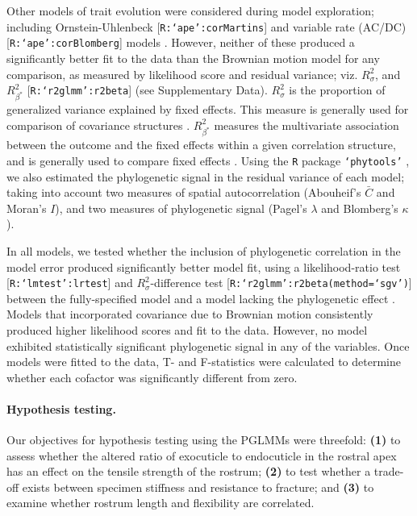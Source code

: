 \documentclass[twocolumn, linenumbers, superscriptaddress, nofootinbib]{revtex4-1}
\begin{document}
				Other models of trait evolution were considered during model exploration; including Ornstein-Uhlenbeck [\texttt{R:`ape':corMartins}] and variable rate (AC/DC) [\texttt{R:`ape':corBlomberg}] models \cite{Munkemuller2012, Ape}.
				However, neither of these produced a significantly better fit to the data than the Brownian motion model for any comparison, as measured by likelihood score and residual variance; viz. $R^2_{\sigma}$, and $R^2_{\beta^*}$ [\texttt{R:`r2glmm':r2beta}] (see Supplementary Data).
				$R^{2}_{\sigma}$ is the proportion of generalized variance explained by fixed effects.
				This measure is generally used for comparison of covariance structures \cite{Nakagawa2013, Jaeger2016, R2glmm}.
				$R^2_{\beta^*}$ measures the multivariate association between the outcome and the fixed effects within a given correlation structure, and is generally used to compare fixed effects \cite{Nakagawa2013, Jaeger2016, R2glmm}.
				Using the \texttt{R} package \texttt{`phytools'} \cite{Munkemuller2012, Phytools}, we also estimated the phylogenetic signal in the residual variance of each model; taking into account two measures of spatial autocorrelation (Abouheif's $\bar{C}$ and Moran's $I$), and two measures of phylogenetic signal (Pagel's $\lambda$ and Blomberg's $\kappa$).
				
				In all models, we tested whether the inclusion of phylogenetic correlation in the model error produced significantly better model fit, using a likelihood-ratio test [\texttt{R:`lmtest':lrtest}] and $R^{2}_{\sigma}$-difference test [\texttt{R:`r2glmm':r2beta(method=`sgv')}] between the fully-specified model and a model lacking the phylogenetic effect \cite{Lmtest, R2glmm}.
				Models that incorporated covariance due to Brownian motion consistently produced higher likelihood scores and fit to the data.
				However, no model exhibited statistically significant phylogenetic signal in any of the variables.
				Once models were fitted to the data, T- and F-statistics were calculated to determine whether each cofactor was significantly different from zero.
				
			\paragraph*{Hypothesis testing.}
				Our objectives for hypothesis testing using the PGLMMs were threefold: \textbf{(1)} to assess whether the altered ratio of exocuticle to endocuticle in the rostral apex has an effect on the tensile strength of the rostrum; \textbf{(2)} to test whether a trade-off exists between specimen stiffness and resistance to fracture; and \textbf{(3)} to examine whether rostrum length and flexibility are correlated.
				
\end{document}

